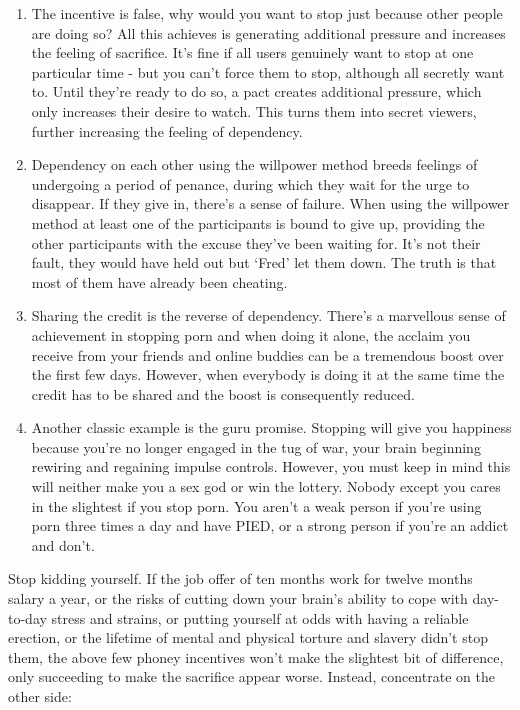 \documentclass[
]{book}
\begin{document}
\begin{enumerate}
\def\labelenumi{\arabic{enumi}.}
\item
  The incentive is false, why would you want to stop just because other people are doing so? All this achieves is generating additional pressure and increases the feeling of sacrifice. It's fine if all users genuinely want to stop at one particular time - but you can't force them to stop, although all secretly want to. Until they're ready to do so, a pact creates additional pressure, which only increases their desire to watch. This turns them into secret viewers, further increasing the feeling of dependency.
\item
  Dependency on each other using the willpower method breeds feelings of undergoing a period of penance, during which they wait for the urge to disappear. If they give in, there's a sense of failure. When using the willpower method at least one of the participants is bound to give up, providing the other participants with the excuse they've been waiting for. It's not their fault, they would have held out but `Fred' let them down. The truth is that most of them have already been cheating.
\item
  Sharing the credit is the reverse of dependency. There's a marvellous sense of achievement in stopping porn and when doing it alone, the acclaim you receive from your friends and online buddies can be a tremendous boost over the first few days. However, when everybody is doing it at the same time the credit has to be shared and the boost is consequently reduced.
\item
  Another classic example is the guru promise. Stopping will give you happiness because you're no longer engaged in the tug of war, your brain beginning rewiring and regaining impulse controls. However, you must keep in mind this will neither make you a sex god or win the lottery. Nobody except you cares in the slightest if you stop porn. You aren't a weak person if you're using porn three times a day and have PIED, or a strong person if you're an addict and don't.
\end{enumerate}

Stop kidding yourself. If the job offer of ten months work for twelve months salary a year, or the risks of cutting down your brain's ability to cope with day-to-day stress and strains, or putting yourself at odds with having a reliable erection, or the lifetime of mental and physical torture and slavery didn't stop them, the above few phoney incentives won't make the slightest bit of difference, only succeeding to make the sacrifice appear worse. Instead, concentrate on the other side:
\end{document}
